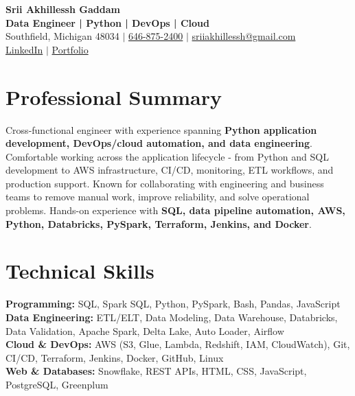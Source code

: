 \documentclass[letterpaper,10pt]{article}
\begin{document}
\fontsize{9.35pt}{10.45pt}\selectfont

\begin{center}
    {\LARGE \textbf{Srii Akhillessh Gaddam}} \\[-1pt]
    \textbf{Data Engineer | Python | DevOps | Cloud} \\[2pt]
    Southfield, Michigan 48034 $|$
    \href{tel:6468752400}{646-875-2400} $|$
    \href{mailto:sriiakhillessh@gmail.com}{sriiakhillessh@gmail.com} \\[1pt]
    \href{https://www.linkedin.com/in/srii-akhiilessh-gaddam-b48668191/}{LinkedIn} $|$
    \href{https://sriiakhillesshg.github.io/portfolio/}{Portfolio}
\end{center}
\vspace{-8pt}

\section{Professional Summary}
\small{Cross-functional engineer with experience spanning \textbf{Python application development, DevOps/cloud automation, and data engineering}. Comfortable working across the application lifecycle - from Python and SQL development to AWS infrastructure, CI/CD, monitoring, ETL workflows, and production support. Known for collaborating with engineering and business teams to remove manual work, improve reliability, and solve operational problems. Hands-on experience with \textbf{SQL, data pipeline automation, AWS, Python, Databricks, PySpark, Terraform, Jenkins, and Docker}.}

\section{Technical Skills}
\small{
\textbf{Programming:} SQL, Spark SQL, Python, PySpark, Bash, Pandas, JavaScript \\
\textbf{Data Engineering:} ETL/ELT, Data Modeling, Data Warehouse, Databricks, Data Validation, Apache Spark, Delta Lake, Auto Loader, Airflow \\
\textbf{Cloud \& DevOps:} AWS (S3, Glue, Lambda, Redshift, IAM, CloudWatch), Git, CI/CD, Terraform, Jenkins, Docker, GitHub, Linux \\
\textbf{Web \& Databases:} Snowflake, REST APIs, HTML, CSS, JavaScript, PostgreSQL, Greenplum
}
\end{document}
